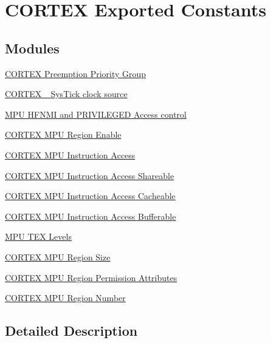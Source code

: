 \hypertarget{group___c_o_r_t_e_x___exported___constants}{}\section{C\+O\+R\+T\+EX Exported Constants}
\label{group___c_o_r_t_e_x___exported___constants}
\subsection*{Modules}
\begin{DoxyCompactItemize}
\item 
\hyperlink{group___c_o_r_t_e_x___preemption___priority___group}{C\+O\+R\+T\+E\+X Preemption Priority Group}
\item 
\hyperlink{group___c_o_r_t_e_x___sys_tick__clock__source}{C\+O\+R\+T\+E\+X \+\_\+\+Sys\+Tick clock source}
\item 
\hyperlink{group___c_o_r_t_e_x___m_p_u___h_f_n_m_i___p_r_i_v_d_e_f___control}{M\+P\+U H\+F\+N\+M\+I and P\+R\+I\+V\+I\+L\+E\+G\+E\+D Access control}
\item 
\hyperlink{group___c_o_r_t_e_x___m_p_u___region___enable}{C\+O\+R\+T\+E\+X M\+P\+U Region Enable}
\item 
\hyperlink{group___c_o_r_t_e_x___m_p_u___instruction___access}{C\+O\+R\+T\+E\+X M\+P\+U Instruction Access}
\item 
\hyperlink{group___c_o_r_t_e_x___m_p_u___access___shareable}{C\+O\+R\+T\+E\+X M\+P\+U Instruction Access Shareable}
\item 
\hyperlink{group___c_o_r_t_e_x___m_p_u___access___cacheable}{C\+O\+R\+T\+E\+X M\+P\+U Instruction Access Cacheable}
\item 
\hyperlink{group___c_o_r_t_e_x___m_p_u___access___bufferable}{C\+O\+R\+T\+E\+X M\+P\+U Instruction Access Bufferable}
\item 
\hyperlink{group___c_o_r_t_e_x___m_p_u___t_e_x___levels}{M\+P\+U T\+E\+X Levels}
\item 
\hyperlink{group___c_o_r_t_e_x___m_p_u___region___size}{C\+O\+R\+T\+E\+X M\+P\+U Region Size}
\item 
\hyperlink{group___c_o_r_t_e_x___m_p_u___region___permission___attributes}{C\+O\+R\+T\+E\+X M\+P\+U Region Permission Attributes}
\item 
\hyperlink{group___c_o_r_t_e_x___m_p_u___region___number}{C\+O\+R\+T\+E\+X M\+P\+U Region Number}
\end{DoxyCompactItemize}


\subsection{Detailed Description}
